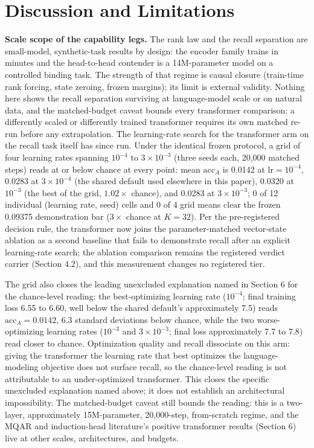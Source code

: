 \section{Discussion and Limitations}

\textbf{Scale scope of the capability legs.} The rank law and the recall
separation are small-model, synthetic-task results by design: the
encoder family trains in minutes and the head-to-head contender is a
14M-parameter model on a controlled binding task. The strength of that
regime is causal closure (train-time rank forcing, state zeroing,
frozen margins); its limit is external validity. Nothing here shows the
recall separation surviving at language-model scale or on natural
data, and the matched-budget caveat bounds every transformer
comparison: a differently scaled or differently trained transformer
requires its own matched re-run before any extrapolation. The
learning-rate search for the transformer arm on the recall task itself
has since run. Under the identical frozen protocol, a grid of four
learning rates spanning $10^{-4}$ to $3 \times 10^{-3}$ (three seeds
each, 20,000 matched steps) reads at or below chance at every point:
mean $\mathrm{acc}_A$ is 0.0142 at $\mathrm{lr}=10^{-4}$, 0.0283 at
$3\times10^{-4}$ (the shared default used elsewhere in this paper),
0.0320 at $10^{-3}$ (the best of the grid, $1.02\times$ chance), and
0.0283 at $3\times10^{-3}$; 0 of 12 individual (learning rate, seed)
cells and 0 of 4 grid means clear the frozen 0.09375 demonstration bar
($3\times$ chance at $K=32$). Per the
pre-registered decision rule, the transformer now joins the
parameter-matched vector-state ablation as a second baseline that
fails to demonstrate recall after an explicit learning-rate search;
the ablation comparison remains the registered verdict carrier
(Section 4.2), and this measurement changes no registered tier.

The grid also closes the leading unexcluded explanation named in
Section 6 for the chance-level reading: the best-optimizing learning
rate ($10^{-4}$; final training loss 6.55 to 6.60, well below the
shared default's approximately 7.5) reads $\mathrm{acc}_A = 0.0142$,
6.3 standard deviations below chance, while the two worse-optimizing
learning rates ($10^{-3}$ and $3\times10^{-3}$; final loss
approximately 7.7 to 7.8) read closer to chance. Optimization quality and recall dissociate on
this arm: giving the transformer the learning rate that best optimizes
the language-modeling objective does not surface recall, so the
chance-level reading is not attributable to an under-optimized
transformer. This closes the specific unexcluded explanation named
above; it does not establish an architectural impossibility. The
matched-budget caveat still bounds the reading: this is a two-layer,
approximately 15M-parameter, 20,000-step, from-scratch regime, and the
MQAR and induction-head literature's positive transformer results
(Section 6) live at other scales, architectures, and budgets.

